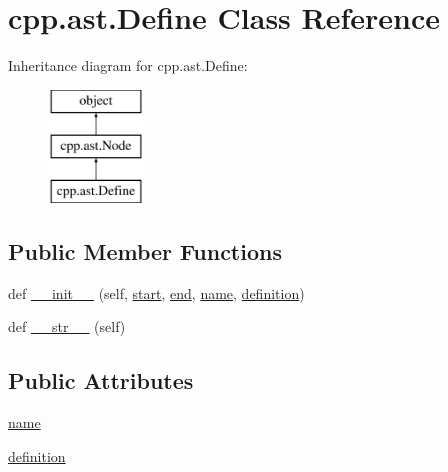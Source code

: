 \hypertarget{classcpp_1_1ast_1_1Define}{}\section{cpp.\+ast.\+Define Class Reference}
\label{classcpp_1_1ast_1_1Define}
Inheritance diagram for cpp.\+ast.\+Define\+:\begin{figure}[H]
\begin{center}
\leavevmode
\includegraphics[height=3.000000cm]{classcpp_1_1ast_1_1Define}
\end{center}
\end{figure}
\subsection*{Public Member Functions}
\begin{DoxyCompactItemize}
\item 
def \mbox{\hyperlink{classcpp_1_1ast_1_1Define_ae9af61866e010a863ba9f8818ec8924c}{\+\_\+\+\_\+init\+\_\+\+\_\+}} (self, \mbox{\hyperlink{classcpp_1_1ast_1_1Node_a7b2aa97e6a049bb1a93aea48c48f1f44}{start}}, \mbox{\hyperlink{classcpp_1_1ast_1_1Node_a3c5e5246ccf619df28eca02e29d69647}{end}}, \mbox{\hyperlink{classcpp_1_1ast_1_1Define_a8879216f09e88f79d7baa49bcfa10ebd}{name}}, \mbox{\hyperlink{classcpp_1_1ast_1_1Define_a0c636652dfeb2f15e62793afea1153c9}{definition}})
\item 
def \mbox{\hyperlink{classcpp_1_1ast_1_1Define_aa89732914b19901c8d291e11f34bb627}{\+\_\+\+\_\+str\+\_\+\+\_\+}} (self)
\end{DoxyCompactItemize}
\subsection*{Public Attributes}
\begin{DoxyCompactItemize}
\item 
\mbox{\hyperlink{classcpp_1_1ast_1_1Define_a8879216f09e88f79d7baa49bcfa10ebd}{name}}
\item 
\mbox{\hyperlink{classcpp_1_1ast_1_1Define_a0c636652dfeb2f15e62793afea1153c9}{definition}}
\end{DoxyCompactItemize}


